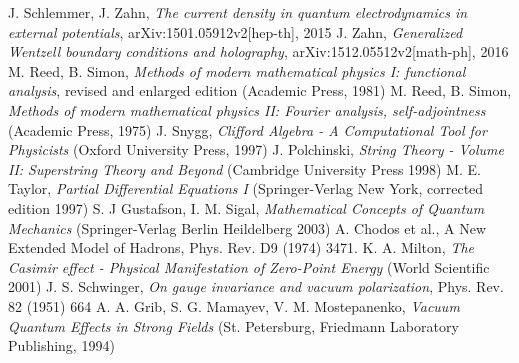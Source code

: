 \documentclass[11pt, oneside]{report}   	%
\title{}
\author{}
\begin{document}

%

%


\begin{thebibliography}{9}
 J. Schlemmer, J. Zahn, \textit{The current density in quantum electrodynamics in external potentials}, arXiv:1501.05912v2[hep-th], 2015
 J. Zahn, \textit{Generalized Wentzell boundary conditions and holography}, arXiv:1512.05512v2[math-ph], 2016
 M. Reed, B. Simon, \textit{Methods of modern mathematical physics I: functional analysis}, revised and enlarged edition (Academic Press, 1981)
 M. Reed, B. Simon, \textit{Methods of modern mathematical physics II: Fourier analysis, self-adjointness} (Academic Press, 1975)
 J. Snygg, \textit{Clifford Algebra - A Computational Tool for Physicists} (Oxford University Press, 1997)
 J. Polchinski, \textit{String Theory - Volume II: Superstring Theory and Beyond} (Cambridge University Press 1998)
 M. E. Taylor, \textit{Partial Differential Equations I} (Springer-Verlag New York, corrected edition 1997)
 S. J Gustafson, I. M. Sigal, \textit{Mathematical Concepts of Quantum Mechanics} (Springer-Verlag Berlin Heildelberg 2003)
 A. Chodos et al., A New Extended Model of Hadrons, Phys. Rev. D9 (1974) 3471.
 K. A. Milton, \textit{The Casimir effect - Physical Manifestation of Zero-Point Energy} (World Scientific 2001)
 J. S. Schwinger, \textit{On gauge invariance and vacuum polarization}, Phys. Rev. 82 (1951) 664
 A. A. Grib, S. G. Mamayev, V. M. Mostepanenko, \textit{Vacuum Quantum Effects in Strong Fields} (St. Petersburg, Friedmann Laboratory Publishing, 1994)\end{thebibliography}
\end{document}

